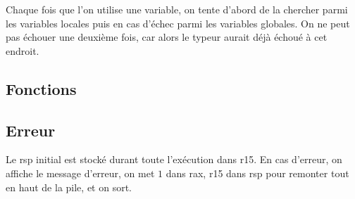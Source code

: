 \documentclass[10pt,a4paper]{article}
\begin{document}
Chaque fois que l'on utilise une variable, on tente d'abord de la chercher parmi les variables locales puis en cas d'échec parmi les variables globales. On ne peut pas échouer une deuxième fois, car alors le typeur aurait déjà échoué à cet endroit.

\subsection{Fonctions}

\subsection{Erreur}
Le rsp initial est stocké durant toute l'exécution dans r15. En cas d'erreur, on affiche le message d'erreur, on met $1$ dans rax, r15 dans rsp pour remonter tout en haut de la pile, et on sort.
\end{document}
